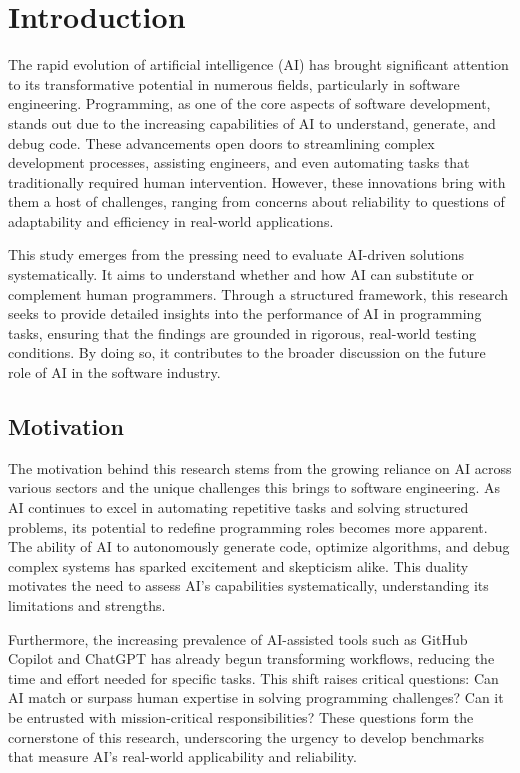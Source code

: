 \section{Introduction}

The rapid evolution of artificial intelligence (AI) has brought significant attention to its transformative potential in numerous fields, particularly in software engineering. Programming, as one of the core aspects of software development, stands out due to the increasing capabilities of AI to understand, generate, and debug code. These advancements open doors to streamlining complex development processes, assisting engineers, and even automating tasks that traditionally required human intervention. However, these innovations bring with them a host of challenges, ranging from concerns about reliability to questions of adaptability and efficiency in real-world applications.

This study emerges from the pressing need to evaluate AI-driven solutions systematically. It aims to understand whether and how AI can substitute or complement human programmers. Through a structured framework, this research seeks to provide detailed insights into the performance of AI in programming tasks, ensuring that the findings are grounded in rigorous, real-world testing conditions. By doing so, it contributes to the broader discussion on the future role of AI in the software industry.

\subsection{Motivation}
The motivation behind this research stems from the growing reliance on AI across various sectors and the unique challenges this brings to software engineering. As AI continues to excel in automating repetitive tasks and solving structured problems, its potential to redefine programming roles becomes more apparent. The ability of AI to autonomously generate code, optimize algorithms, and debug complex systems has sparked excitement and skepticism alike. This duality motivates the need to assess AI's capabilities systematically, understanding its limitations and strengths.

Furthermore, the increasing prevalence of AI-assisted tools such as GitHub Copilot and ChatGPT has already begun transforming workflows, reducing the time and effort needed for specific tasks. This shift raises critical questions: Can AI match or surpass human expertise in solving programming challenges? Can it be entrusted with mission-critical responsibilities? These questions form the cornerstone of this research, underscoring the urgency to develop benchmarks that measure AI's real-world applicability and reliability.

